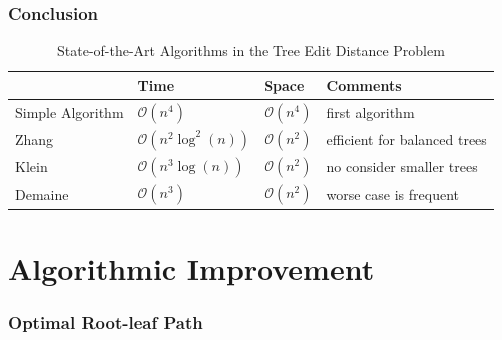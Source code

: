 \documentclass{beamer}
\begin{document}
\begin{frame}
\frametitle{Conclusion}
\begin{table}
			\centering
			\begin{tabular}{l l l l}
				\toprule
				\textbf{} & \textbf{Time} & \textbf{Space} & \textbf{Comments}\\

				\midrule
				Simple Algorithm &  $\mathcal{O}(n^4)$ & $\mathcal{O}(n^4)$ & first algorithm\\
				Zhang & $\mathcal{O}(n^2\log^2(n))$ & $\mathcal{O}(n^2)$ & efficient for balanced trees \\
				Klein &  $\mathcal{O}(n^3\log(n))$ & $\mathcal{O}(n^2)$ &  no consider smaller trees\\
				Demaine &  $\mathcal{O}(n^3)$ & $\mathcal{O}(n^2)$ & worse case is frequent\\
			\end{tabular}
		\caption{State-of-the-Art Algorithms in the Tree Edit Distance Problem}
\end{table}
\end{frame}
\section{Algorithmic Improvement}
\begin{frame}
\frametitle{Optimal Root-leaf Path}

\end{frame}
\end{document}
